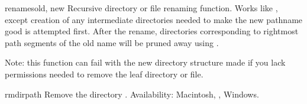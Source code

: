 \begin{funcdesc}{renames}{old, new}
Recursive directory or file renaming function.
Works like , except creation of any intermediate
directories needed to make the new pathname good is attempted first.
After the rename, directories corresponding to rightmost path segments
of the old name will be pruned away using .

Note: this function can fail with the new directory structure made if
you lack permissions needed to remove the leaf directory or file.
\end{funcdesc}

\begin{funcdesc}{rmdir}{path}
Remove the directory .
Availability: Macintosh, \UNIX, Windows.
\end{funcdesc}

